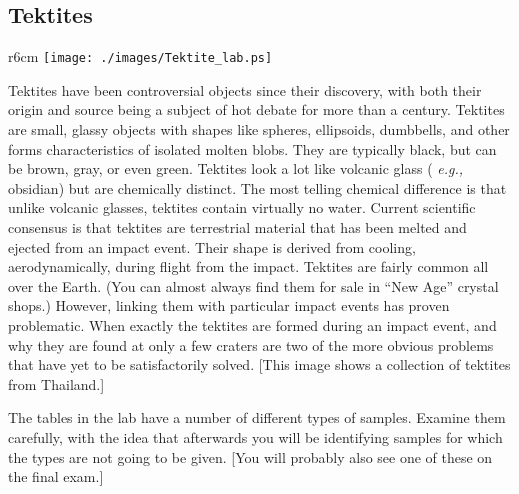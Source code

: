 \vfill

\subsection*{Tektites}

\begin{wrapfigure}{r}{6cm}
\texttt{[image: ./images/Tektite\_lab.ps]}
\end{wrapfigure}

Tektites have been controversial objects since their discovery, with
both their origin and source being a subject of hot debate for more
than a century.  Tektites are small, glassy objects with shapes like
spheres, ellipsoids, dumbbells, and other forms characteristics of
isolated molten blobs.  They are typically black, but can be brown,
gray, or even green.  Tektites look a lot like volcanic glass ({\it
  e.g.,} obsidian) but are chemically distinct.  The most telling
chemical difference is that unlike volcanic glasses, tektites contain
virtually no water.  Current scientific consensus is that tektites are
terrestrial material that has been melted and ejected from an impact
event.  Their shape is derived from cooling, aerodynamically, during
flight from the impact.  Tektites are fairly common all over the
Earth.  (You can almost always find them for sale in ``New Age''
crystal shops.)  However, linking them with particular impact events
has proven problematic.  When exactly the tektites are formed during an
impact event, and why they are found at only a few craters are two of
the more obvious problems that have yet to be satisfactorily solved.
[This image shows a collection of tektites from Thailand.]

\vfill

\clearpage

\Top


\vfill

The tables in the lab have a number of different types of samples.
Examine them carefully, with the idea that afterwards you will be
identifying samples for which the types are not going to be given.
[You will probably also see one of these on the final exam.]

\vfill

\footnotesize

